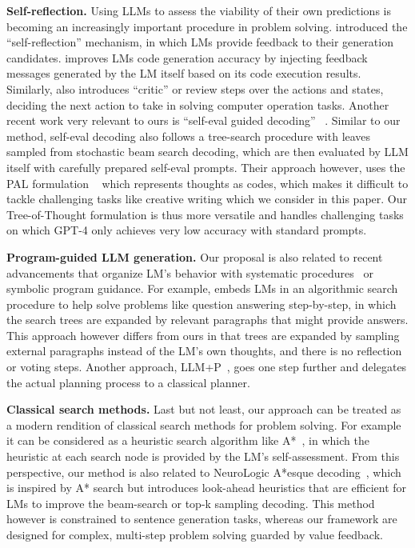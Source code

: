 \textbf{Self-reflection.} Using LLMs to assess the viability of their own predictions is becoming an increasingly important procedure in problem solving. \citep{shinn2023reflexion,madaan2023selfrefine,paul2023refiner} introduced the ``self-reflection'' mechanism, in which LMs provide feedback to their generation candidates. \citep{chen2023teaching} improves LMs code generation accuracy by injecting feedback messages generated by the LM itself based on its code execution results. Similarly, \citep{kim2023language} also introduces ``critic'' or review steps over the actions and states,  deciding the next action to take in solving computer operation tasks. Another recent work very relevant to ours is ``self-eval guided decoding'' ~\citep{xie2023decomposition}. Similar to our method, self-eval decoding also follows a tree-search procedure with leaves sampled from stochastic beam search decoding, which are then evaluated by LLM itself with carefully prepared self-eval prompts. Their approach however, uses the PAL formulation ~\citep{gao2023pal} which represents thoughts as codes, which makes it difficult to tackle challenging tasks like creative writing which we consider in this paper. Our Tree-of-Thought formulation is thus more versatile and handles challenging tasks on which GPT-4 only achieves very low accuracy with standard prompts.

\textbf{Program-guided LLM generation.} Our proposal is also related to recent advancements that organize LM's behavior with systematic procedures~\citep{jung2022maieutic, zhu2022solving, creswell2022faithful, zhou2022least} or symbolic program guidance. For example, \citet{schlag2023large} embeds LMs in an algorithmic search procedure to help solve problems like question answering step-by-step, in which the search trees are expanded by relevant paragraphs that might provide answers. This approach however differs from ours in that trees are expanded by sampling external paragraphs instead of the LM's own thoughts, and there is no reflection or voting steps. Another approach, LLM+P~\citep{liu2023llmp}, goes one step further and delegates the actual planning process to a classical planner.

\textbf{Classical search methods.} Last but not least, our approach can be treated as a modern rendition of classical search methods for problem solving. For example it can be considered as a heuristic search algorithm like A*~\citep{a-star}, in which the heuristic at each search node is provided by the LM's self-assessment. From this perspective, our method is also related to NeuroLogic A*esque decoding~\citep{Lu2021NeuroLogicAD}, which is inspired by A* search but introduces look-ahead heuristics that are efficient for LMs to improve the beam-search or top-k sampling decoding. This method however is constrained to sentence generation tasks, whereas our framework are designed for complex, multi-step problem solving guarded by value feedback.

